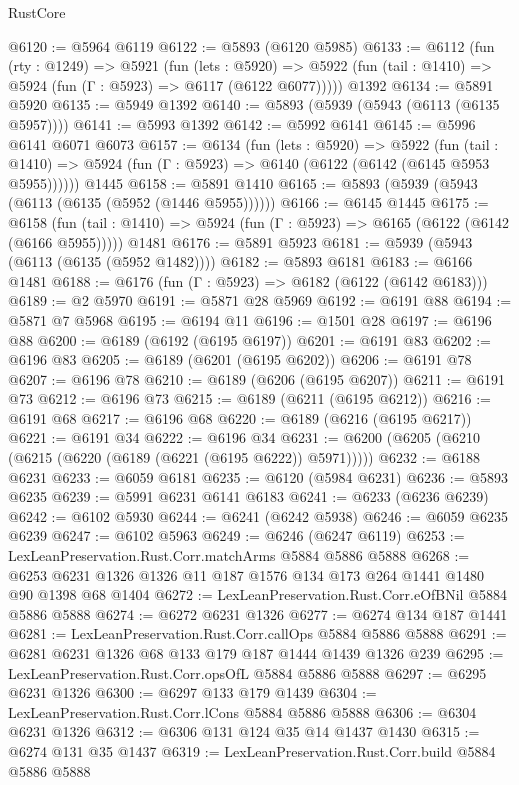 \begin{lexlean}{RustCore}
\begin{coremodule}
@6120 := @5964 @6119
@6122 := @5893 (@6120 @5985)
@6133 := @6112
    (fun (rty : @1249) =>
    @5921
      (fun (lets : @5920) =>
      @5922 (fun (tail : @1410) => @5924 (fun (Γ : @5923) => @6117 (@6122 @6077)))))
    @1392
@6134 := @5891 @5920
@6135 := @5949 @1392
@6140 := @5893 (@5939 (@5943 (@6113 (@6135 @5957))))
@6141 := @5993 @1392
@6142 := @5992 @6141
@6145 := @5996 @6141 @6071 @6073
@6157 := @6134
    (fun (lets : @5920) =>
    @5922
      (fun (tail : @1410) => @5924 (fun (Γ : @5923) => @6140 (@6122 (@6142 (@6145 @5953 @5955))))))
    @1445
@6158 := @5891 @1410
@6165 := @5893 (@5939 (@5943 (@6113 (@6135 (@5952 (@1446 @5955))))))
@6166 := @6145 @1445
@6175 := @6158
    (fun (tail : @1410) => @5924 (fun (Γ : @5923) => @6165 (@6122 (@6142 (@6166 @5955)))))
    @1481
@6176 := @5891 @5923
@6181 := @5939 (@5943 (@6113 (@6135 (@5952 @1482))))
@6182 := @5893 @6181
@6183 := @6166 @1481
@6188 := @6176 (fun (Γ : @5923) => @6182 (@6122 (@6142 @6183)))
@6189 := @2 @5970
@6191 := @5871 @28 @5969
@6192 := @6191 @88
@6194 := @5871 @7 @5968
@6195 := @6194 @11
@6196 := @1501 @28
@6197 := @6196 @88
@6200 := @6189 (@6192 (@6195 @6197))
@6201 := @6191 @83
@6202 := @6196 @83
@6205 := @6189 (@6201 (@6195 @6202))
@6206 := @6191 @78
@6207 := @6196 @78
@6210 := @6189 (@6206 (@6195 @6207))
@6211 := @6191 @73
@6212 := @6196 @73
@6215 := @6189 (@6211 (@6195 @6212))
@6216 := @6191 @68
@6217 := @6196 @68
@6220 := @6189 (@6216 (@6195 @6217))
@6221 := @6191 @34
@6222 := @6196 @34
@6231 := @6200 (@6205 (@6210 (@6215 (@6220 (@6189 (@6221 (@6195 @6222)) @5971)))))
@6232 := @6188 @6231
@6233 := @6059 @6181
@6235 := @6120 (@5984 @6231)
@6236 := @5893 @6235
@6239 := @5991 @6231 @6141 @6183
@6241 := @6233 (@6236 @6239)
@6242 := @6102 @5930
@6244 := @6241 (@6242 @5938)
@6246 := @6059 @6235 @6239
@6247 := @6102 @5963
@6249 := @6246 (@6247 @6119)
@6253 := LexLeanPreservation.Rust.Corr.matchArms @5884 @5886 @5888
@6268 := @6253 @6231 @1326 @1326 @11 @187 @1576 @134 @173 @264 @1441 @1480 @90 @1398 @68 @1404
@6272 := LexLeanPreservation.Rust.Corr.eOfBNil @5884 @5886 @5888
@6274 := @6272 @6231 @1326
@6277 := @6274 @134 @187 @1441
@6281 := LexLeanPreservation.Rust.Corr.callOps @5884 @5886 @5888
@6291 := @6281 @6231 @1326 @68 @133 @179 @187 @1444 @1439 @1326 @239
@6295 := LexLeanPreservation.Rust.Corr.opsOfL @5884 @5886 @5888
@6297 := @6295 @6231 @1326
@6300 := @6297 @133 @179 @1439
@6304 := LexLeanPreservation.Rust.Corr.lCons @5884 @5886 @5888
@6306 := @6304 @6231 @1326
@6312 := @6306 @131 @124 @35 @14 @1437 @1430
@6315 := @6274 @131 @35 @1437
@6319 := LexLeanPreservation.Rust.Corr.build @5884 @5886 @5888

\end{coremodule}
\end{lexlean}
